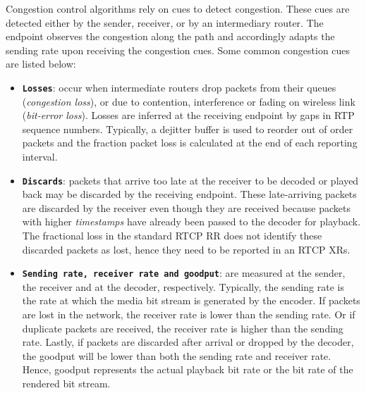 Congestion control algorithms rely on cues to detect congestion. These cues
are detected either by the sender, receiver, or by an intermediary router. The
endpoint observes the congestion along the path and accordingly adapts the
sending rate upon receiving the congestion cues. 
Some common congestion cues are listed below:

\begin{itemize}
\setlength{\itemsep}{0pt}

\item \textbf{\texttt{Losses}}: occur when intermediate routers drop packets
from their queues (\emph{congestion loss}), or due to contention, interference
or fading on wireless link (\emph {bit-error loss}). Losses are inferred at
the receiving endpoint by gaps in RTP sequence numbers. Typically, a dejitter
buffer is used to reorder out of order packets and the fraction packet loss is
calculated at the end of each reporting interval.

\item \textbf{\texttt{Discards}}: packets that arrive too late at the receiver
to be decoded or played back may be discarded by the receiving endpoint. These
late-arriving packets are discarded by the receiver even though they are
received because packets with higher \textit{timestamps} have already been
passed to the decoder for playback. The fractional loss in the standard RTCP
RR does not identify these discarded packets as lost, hence they need to be
reported in an RTCP XRs.

\item \textbf{\texttt{Sending rate, receiver rate and goodput}}: are measured
at the sender, the receiver and at the decoder, respectively. Typically, the
sending rate is the rate at which the media bit stream is generated by the
encoder. If packets are lost in the network, the receiver rate is lower than
the sending rate. Or if duplicate packets are received, the receiver rate is
higher than the sending rate. Lastly, if packets are discarded after arrival
or dropped by the decoder, the goodput will be lower than both the sending
rate and receiver rate. Hence, goodput represents the actual playback bit rate
or the bit rate of the rendered bit stream.


\end{itemize}
